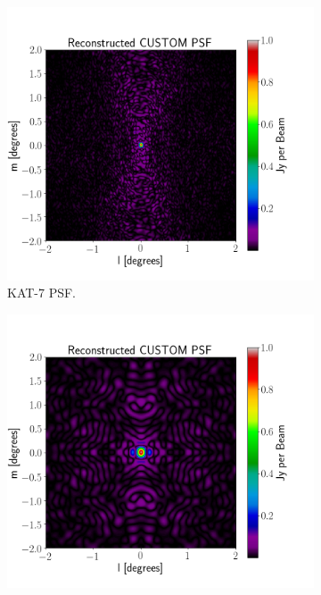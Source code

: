 \begin{figure}[H]
  \centering
  \begin{subfigure}[b]{0.49\textwidth}
    \includegraphics[width=\textwidth]{images/KAT_7_PSF.png}
    \caption{KAT-7 PSF.}
    \label{fig:1}
  \end{subfigure}
  \begin{subfigure}[b]{0.49\textwidth}
    \includegraphics[width=\textwidth]{images/HERA_19_PSF.png}

\end{subfigure}
\end{figure}
